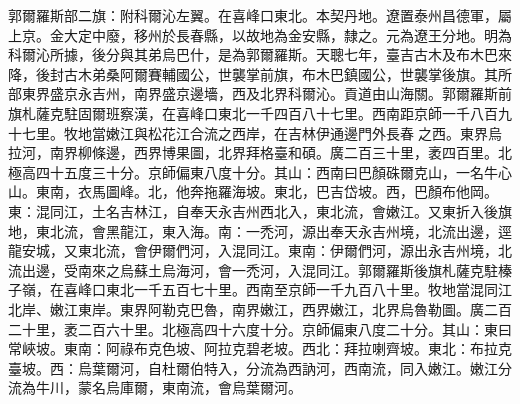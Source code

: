 \begin{pinyinscope}
郭爾羅斯部二旗：附科爾沁左翼。在喜峰口東北。本契丹地。遼置泰州昌德軍，屬上京。金大定中廢，移州於長春縣，以故地為金安縣，隸之。元為遼王分地。明為科爾沁所據，後分與其弟烏巴什，是為郭爾羅斯。天聰七年，臺吉古木及布木巴來降，後封古木弟桑阿爾賽輔國公，世襲掌前旗，布木巴鎮國公，世襲掌後旗。其所部東界盛京永吉州，南界盛京邊墻，西及北界科爾沁。貢道由山海關。郭爾羅斯前旗札薩克駐固爾班察漢，在喜峰口東北一千四百八十七里。西南距京師一千八百九十七里。牧地當嫩江與松花江合流之西岸，在吉林伊通邊門外長春之西。東界烏拉河，南界柳條邊，西界博果圖，北界拜格臺和碩。廣二百三十里，袤四百里。北極高四十五度三十分。京師偏東八度十分。其山：西南曰巴顏硃爾克山，一名牛心山。東南，衣馬圖峰。北，他奔拖羅海坡。東北，巴吉岱坡。西，巴顏布他岡。東：混同江，土名吉林江，自奉天永吉州西北入，東北流，會嫩江。又東折入後旗地，東北流，會黑龍江，東入海。南：一禿河，源出奉天永吉州境，北流出邊，逕龍安城，又東北流，會伊爾們河，入混同江。東南：伊爾們河，源出永吉州境，北流出邊，受南來之烏蘇土烏海河，會一禿河，入混同江。郭爾羅斯後旗札薩克駐榛子嶺，在喜峰口東北一千五百七十里。西南至京師一千九百八十里。牧地當混同江北岸、嫩江東岸。東界阿勒克巴魯，南界嫩江，西界嫩江，北界烏魯勒圖。廣二百二十里，袤二百六十里。北極高四十六度十分。京師偏東八度二十分。其山：東曰常峽坡。東南：阿祿布克色坡、阿拉克碧老坡。西北：拜拉喇齊坡。東北：布拉克臺坡。西：烏葉爾河，自杜爾伯特入，分流為西訥河，西南流，同入嫩江。嫩江分流為牛川，蒙名烏庫爾，東南流，會烏葉爾河。


\end{pinyinscope}

